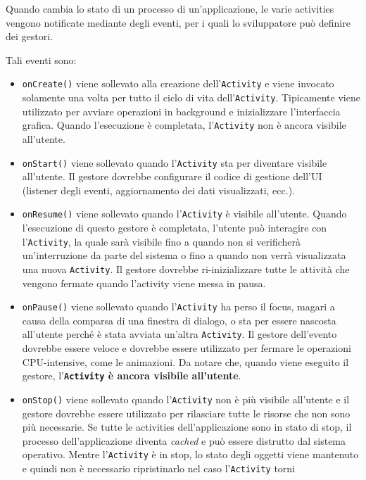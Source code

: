 Quando cambia lo stato di un processo di un'applicazione, le varie
activities vengono notificate mediante degli eventi, per i quali lo
sviluppatore può definire dei gestori.

Tali eventi sono:

\begin{itemize}
	\item \texttt{onCreate()} viene sollevato alla creazione dell'\texttt{Activity} e
		viene invocato solamente una volta per tutto il ciclo di vita
		dell'\texttt{Activity}. Tipicamente viene utilizzato per avviare operazioni in
		background e inizializzare l'interfaccia grafica. Quando
		l'esecuzione è completata, l'\texttt{Activity} non è ancora visibile
		all'utente.
	\item \texttt{onStart()} viene sollevato quando l'\texttt{Activity} sta per diventare
		visibile all'utente. Il gestore dovrebbe configurare il codice di
		gestione dell'UI (listener degli eventi, aggiornamento dei dati
		visualizzati, ecc.).
	\item \texttt{onResume()} viene sollevato quando l'\texttt{Activity} è visibile
		all'utente. Quando l'esecuzione di questo gestore è completata,
		l'utente può interagire con l'\texttt{Activity}, la quale sarà visibile fino a
		quando non si verificherà un'interruzione da parte del sistema o fino
		a quando non verrà visualizzata una nuova \texttt{Activity}. Il gestore
		dovrebbe ri-inizializzare tutte le attività che vengono fermate quando
		l'activity viene messa in pausa.
	\item \texttt{onPause()} viene sollevato quando l'\texttt{Activity} ha perso il
		focus, magari a causa della comparsa di una finestra di dialogo, o sta
		per essere nascosta all'utente perché è stata avviata un'altra
		\texttt{Activity}. Il gestore dell'evento dovrebbe essere veloce e dovrebbe
		essere utilizzato per fermare le operazioni CPU-intensive, come le
		animazioni. Da notare che, quando viene eseguito il gestore,
		l'\textbf{\texttt{Activity} è ancora visibile all'utente}.
	\item \texttt{onStop()} viene sollevato quando l'\texttt{Activity} non è più visibile
		all'utente e il gestore dovrebbe essere utilizzato per rilasciare
		tutte le risorse che non sono più necessarie. Se tutte le activities
		dell'applicazione sono in stato di stop, il processo dell'applicazione
		diventa \emph{cached} e può essere distrutto dal sistema operativo.
		Mentre l'\texttt{Activity} è in stop, lo stato degli oggetti viene mantenuto e
		quindi non è necessario ripristinarlo nel caso l'\texttt{Activity} torni

\end{itemize}
